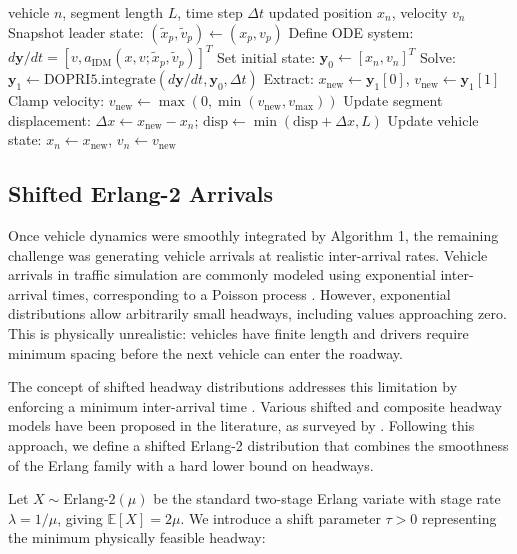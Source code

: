 \documentclass{scspaperproc}
\theoremstyle{scsthe}
\begin{document}
    \begin{algorithm}
        \caption{Per-Vehicle IDM Update with Dormand-Prince Integration}
        \begin{algorithmic}[1]
            \Require vehicle $n$, segment length $L$, time step $\Delta t$
            \Ensure updated position $x_n$, velocity $v_n$
            \State Snapshot leader state: $(\tilde{x}_p, \tilde{v}_p) \gets (x_p, v_p)$
            \State Define ODE system: $d\mathbf{y}/dt = [v, a_{\text{IDM}}(x, v; \tilde{x}_p, \tilde{v}_p)]^T$
            \State Set initial state: $\mathbf{y}_0 \gets [x_n, v_n]^T$
            \State Solve: $\mathbf{y}_1 \gets \text{DOPRI5.integrate}(d\mathbf{y}/dt, \mathbf{y}_0, \Delta t)$
            \State Extract: $x_{\text{new}} \gets \mathbf{y}_1[0]$, $v_{\text{new}} \gets \mathbf{y}_1[1]$
            \State Clamp velocity: $v_{\text{new}} \gets \max(0, \min(v_{\text{new}}, v_{\max}))$
            \State Update segment displacement: $\Delta x \gets x_{\text{new}} - x_n$; $\text{disp} \gets \min(\text{disp} + \Delta x, L)$
            \State Update vehicle state: $x_n \gets x_{\text{new}}$, $v_n \gets v_{\text{new}}$
        \end{algorithmic}
    \end{algorithm}

    \subsection{Shifted Erlang-2 Arrivals}
    Once vehicle dynamics were smoothly integrated by Algorithm 1, the remaining challenge was generating vehicle arrivals at realistic inter-arrival rates. Vehicle arrivals in traffic simulation are commonly modeled using exponential inter-arrival times, corresponding to a Poisson process \cite{law2007simulation}. However, exponential distributions allow arbitrarily small headways, including values approaching zero. This is physically unrealistic: vehicles have finite length and drivers require minimum spacing before the next vehicle can enter the roadway.

    The concept of shifted headway distributions addresses this limitation by enforcing a minimum inter-arrival time \cite{cowan1975useful}. Various shifted and composite headway models have been proposed in the literature, as surveyed by \cite{li2017vehicle}. Following this approach, we define a shifted Erlang-2 distribution that combines the smoothness of the Erlang family with a hard lower bound on headways.

    Let $X \sim \text{Erlang-2}(\mu)$ be the standard two-stage Erlang variate with stage rate $\lambda = 1/\mu$, giving $\mathbb{E}[X] = 2\mu$. We introduce a shift parameter $\tau > 0$ representing the minimum physically feasible headway:
\end{document}
